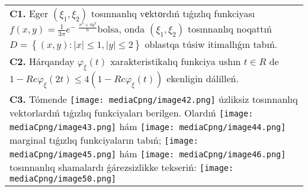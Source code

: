 \documentclass{article}
\begin{document}
\begin{tabular}{m{17cm}}
 \\
\textbf{C1.} Eger \(\left( \xi_{1},\xi_{2} \right)\) tosınnanlıq vеktоrdıń tıǵızlıq funkciyası \(f(x,y) = \frac{1}{3\pi}e^{- \ \ \frac{x^{2} + 4y^{2}}{6}}\)bolsa, onda \(\left( \xi_{1},\xi_{2} \right)\) tosınnanlıq noqattıń \(D = \left\{ (x,y):|x| \leq 1,|y| \leq 2 \right\}\) oblastqa túsiw itimallıǵın tabıń.
 \\
\textbf{C2.} Hárqanday \(\varphi_{\xi}(t)\) xarakteristikalıq funkciya ushın \(t \in R\) de \(1 - Re\varphi_{\xi}(2t) \leq 4\left( 1 - Re\varphi_{\xi}(t) \right)\) ekenligin dálilleń.
 \\
\textbf{C3.} Tómende \texttt{[image: mediaCpng/image42.png]} úzliksiz tosınnanlıq vektorlardıń tıǵızlıq funkciyaları berilgen. Olardıń \texttt{[image: mediaCpng/image43.png]} hám \texttt{[image: mediaCpng/image44.png]} marginal tıǵızlıq funkciyaların tabıń; \texttt{[image: mediaCpng/image45.png]} hám \texttt{[image: mediaCpng/image46.png]} tosınnanlıq shamalardı ǵárezsizlikke tekseriń: \texttt{[image: mediaCpng/image50.png]}
 \\

\end{tabular}
\vspace{1cm}
\end{document}
